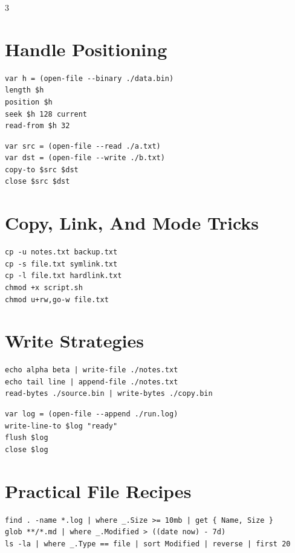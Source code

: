 \begin{multicols*}{3}
\section{Handle Positioning}
\begin{lstlisting}
var h = (open-file --binary ./data.bin)
length $h
position $h
seek $h 128 current
read-from $h 32
\end{lstlisting}

\begin{lstlisting}
var src = (open-file --read ./a.txt)
var dst = (open-file --write ./b.txt)
copy-to $src $dst
close $src $dst
\end{lstlisting}


\section{Copy, Link, And Mode Tricks}
\begin{lstlisting}
cp -u notes.txt backup.txt
cp -s file.txt symlink.txt
cp -l file.txt hardlink.txt
chmod +x script.sh
chmod u+rw,go-w file.txt
\end{lstlisting}

\columnbreak

\section{Write Strategies}
\begin{lstlisting}
echo alpha beta | write-file ./notes.txt
echo tail line | append-file ./notes.txt
read-bytes ./source.bin | write-bytes ./copy.bin
\end{lstlisting}

\begin{lstlisting}
var log = (open-file --append ./run.log)
write-line-to $log "ready"
flush $log
close $log
\end{lstlisting}

\section{Practical File Recipes}
\begin{lstlisting}
find . -name *.log | where _.Size >= 10mb | get { Name, Size }
glob **/*.md | where _.Modified > ((date now) - 7d)
ls -la | where _.Type == file | sort Modified | reverse | first 20
\end{lstlisting}


\end{multicols*}
